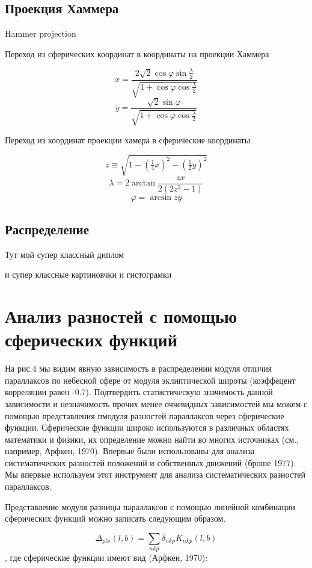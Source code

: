 \documentclass[14pt]{article} %
\begin{document}
\subsection{Проекция Хаммера}\label{sub:smthrs}

Hammer projection

Переход из сферических координат в координаты на проекции Хаммера

$$ x = \frac{2 \sqrt 2 \cos \varphi \sin \frac{\lambda}{2}}{\sqrt{1 + \cos \varphi \cos \frac{\lambda}{2}}} $$
$$y = \frac{\sqrt 2\sin \varphi}{\sqrt{1 + \cos \varphi \cos \frac{\lambda}{2}}}$$

Переход из координат проекции хамера в сферические координаты

$$z \equiv \sqrt{1 - \left(\tfrac14 x\right)^2 - \left(\tfrac12 y\right)^2}$$
$$ \lambda = 2 \arctan \frac{zx}{2\left(2z^2 - 1\right)} $$
$$ \varphi = \arcsin zy $$


\subsection{Распределение}\label{sub:smthrs}
Тут мой супер классный диплом

и супер классные картиновчки и гистограмки


\section{Анализ разностей с помощью сферических функций}\label{sistem}
 На рис.4 мы видим явную зависимость в распределении модуля отличия параллаксов по небесной сфере от модуля эклиптической широты (коэффецент корреляции равен -0.7).  Подтвердить статистическую значимость данной зависимости и незначимость прочих менее оччевидных зависимостей мы можем с помощью представления пмодуля разностей параллаксов через сферические функции. Сферические функции широко используются в различных областях математики и физики, их определение можно найти во многих источниках (см., например, Арфкен, 1970). Впервые  были использованы для анализа систематических разностей положений и собственных движений (броше 1977). Мы впервые используем этот инструмент для анализа систематических разностей параллаксов.
 
Представление модуля разницы параллаксов с помощью линейной комбинации сферических функций можно записать следующим образом.

$$ \Delta_{plx} (l,b) = \sum_{nkp}\delta_{nkp}K_{nkp}(l,b) $$,
где сферические функции имеют вид (Арфкен, 1970):
\end{document}
